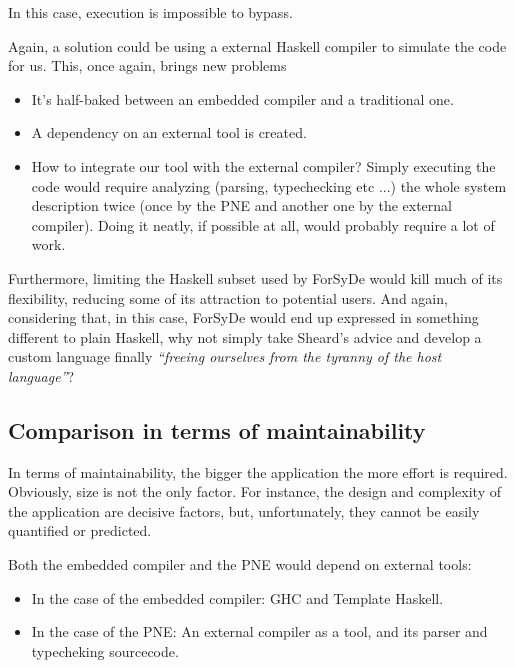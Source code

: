 \documentclass[a4paper,twoside,11pt]{article}
\begin{document}
\begin{itemize}
  In this case, execution is impossible to bypass. 

  Again, a solution could be using a external Haskell compiler to simulate the
  code for us. This, once again, brings new problems
  \begin{itemize}
    \item It's half-baked between an embedded compiler and a traditional one.
    \item A dependency on an external tool is created.
    \item How to integrate our tool with the external compiler?  Simply
      executing the code would require analyzing (parsing, typechecking etc
      ...) the whole system description twice (once by the PNE and another one
      by the external compiler).  Doing it neatly, if possible at all, would
      probably require a lot of work.
    \end{itemize}
\end{itemize}

Furthermore, limiting the Haskell subset used by ForSyDe would kill much of
its flexibility, reducing some of its attraction to potential users. And
again, considering that, in this case, ForSyDe would end up expressed in
something different to plain Haskell, why not simply take Sheard's advice
\cite{another} and develop a custom language finally \textit{``freeing
  ourselves from the tyranny of the host language''}?



\subsection{Comparison in terms of maintainability}

In terms of maintainability, the bigger the application the more effort is
required. Obviously, size is not the only factor. For instance, the design and
complexity of the application are decisive factors, but, unfortunately, they
cannot be easily quantified or predicted.

Both the embedded compiler and the PNE would depend on external
tools:

\begin{itemize}
\item In the case of the embedded compiler: GHC and Template Haskell.
\item In the case of the PNE: An external compiler as a tool, and its parser
  and typecheking sourcecode.
\end{itemize}
\end{document}
